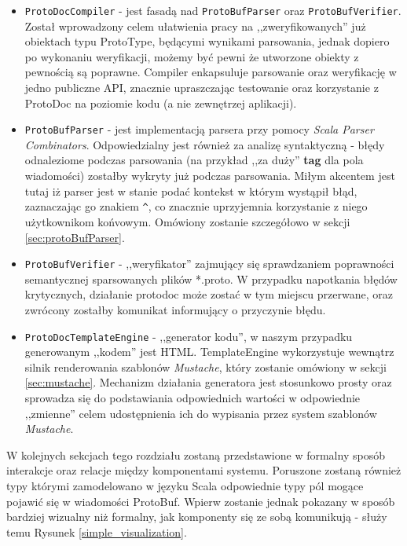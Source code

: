 \documentclass[pdflatex,11pt]{aghdpl}
\begin{document}
\begin{itemize}
 \item \verb|ProtoDocCompiler| - jest fasadą nad \verb|ProtoBufParser| oraz \verb|ProtoBufVerifier|. Został wprowadzony celem 
                                 ułatwienia pracy na ,,zweryfikowanych'' już obiektach typu ProtoType, będącymi wynikami parsowania,
                                 jednak dopiero po wykonaniu weryfikacji, możemy być pewni że utworzone obiekty z pewnością są poprawne. 
                                 Compiler enkapsuluje parsowanie oraz weryfikację w jedno publiczne API, znacznie upraszczając testowanie oraz korzystanie z
				 ProtoDoc na poziomie kodu (a nie zewnętrzej aplikacji).
 \item \verb|ProtoBufParser| - jest implementacją parsera przy pomocy \textit{Scala Parser Combinators}. Odpowiedzialny jest również za analizę syntaktyczną - 
                               błędy odnaleziome podczas parsowania (na przykład ,,za duży'' \textbf{tag} dla pola wiadomości) zostałby wykryty już podczas parsowania.
			       Miłym akcentem jest tutaj iż parser jest w stanie podać kontekst w którym wystąpił błąd, zaznaczając go znakiem \verb|^|, 
			       co znacznie uprzyjemnia korzystanie z niego użytkownikom końvowym.
                               Omówiony zostanie szczegółowo w sekcji \ref{sec:protoBufParser}.

 \item \verb|ProtoBufVerifier| - ,,weryfikator'' zajmujący się sprawdzaniem poprawności semantycznej sparsowanych plików *.proto.
                                 W przypadku napotkania błędów krytycznych, działanie protodoc może zostać w tym miejscu przerwane,
                                 oraz zwrócony zostałby komunikat informujący o przyczynie błędu.
 \item \verb|ProtoDocTemplateEngine| - ,,generator kodu'', w naszym przypadku generowanym ,,kodem'' jest HTML. TemplateEngine wykorzystuje 
                                     wewnątrz silnik renderowania szablonów \textit{Mustache}, który zostanie omówiony w sekcji \ref{sec:mustache}.
                                     Mechanizm działania generatora jest stosunkowo prosty oraz sprowadza się do podstawiania odpowiednich wartości 
				     w odpowiednie ,,zmienne'' celem udostępnienia ich do wypisania przez system szablonów \textit{Mustache}.
\end{itemize}

\newpage 

W kolejnych sekcjach tego rozdziału zostaną przedstawione w formalny sposób interakcje oraz relacje między komponentami systemu.
Poruszone zostaną również typy którymi zamodelowano w języku Scala odpowiednie typy pól mogące pojawić się w wiadomości ProtoBuf.
Wpierw zostanie jednak pokazany w sposób bardziej wizualny niż formalny, jak komponenty się ze sobą komunikują - służy temu Rysunek \ref{simple_visualization}.
\end{document}
